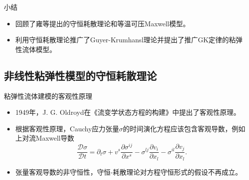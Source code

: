 \documentclass[mathserif]{beamer}
\begin{document}
\begin{frame}{小结}
\begin{itemize}
	\item<1-> 回顾了雍等提出的守恒耗散理论和等温可压Maxwell模型。
	\item<2-> 利用守恒耗散理论推广了Guyer-Krumhansl理论并提出了推广GK定律的粘弹性流体模型。
\end{itemize}
\end{frame}

\subsection{非线性粘弹性模型的守恒耗散理论}
\begin{frame}{粘弹性流体建模的客观性原理}
\begin{itemize}
\item<2-> 1949年，J. G. Oldroyd在《流变学状态方程的构建》中提出了客观性原理。
\item<3-> 根据客观性原理，Cauchy应力张量$\sigma$的时间演化方程应该包含客观导数，例如上对流Maxwell导数
\begin{equation*}
	\frac{\mathcal{D} \sigma}{\mathcal{D}t} = \partial_t \sigma + v^s \frac{\partial \sigma^{ij}}{\partial x^s} - \sigma^{lj} \frac{\partial v_i}{\partial x_l} -  \sigma^{il} \frac{\partial v_j}{\partial x_l}. 
\end{equation*}
\item<4-> 张量客观导数的非守恒性，守恒-耗散理论对方程守恒形式的假设不再成立。%
\end{itemize}
\end{frame}
\end{document}
